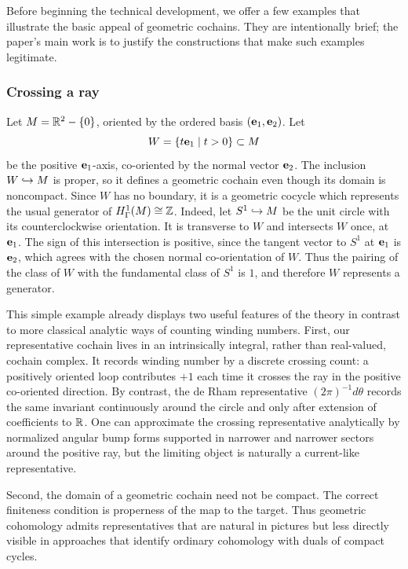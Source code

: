 
Before beginning the technical development, we offer a few examples that illustrate the basic appeal of geometric cochains.
They are intentionally brief; the paper's main work is to justify the constructions that make such examples legitimate.

\subsubsection{Crossing a ray}

Let $M = \mathbb{R}^2 - \{0\}$, oriented by the ordered basis $(\mathbf{e}_1,\mathbf{e}_2)$.
Let
\[
W = \{t\mathbf{e}_1 \mid t > 0\} \subset M
\]
be the positive $\mathbf{e}_1$-axis, co-oriented by the normal vector $\mathbf{e}_2$.
The inclusion $W \hookrightarrow M$ is proper, so it defines a geometric cochain even though its domain is noncompact.
Since $W$ has no boundary, it is a geometric cocycle which represents the usual generator of $H^1_\Gamma(M) \cong \mathbb{Z}$.
Indeed, let $S^1 \hookrightarrow M$ be the unit circle with its counterclockwise orientation.
It is transverse to $W$ and intersects $W$ once, at $\mathbf{e}_1$.
The sign of this intersection is positive, since the tangent vector to $S^1$ at $\mathbf{e}_1$ is $\mathbf{e}_2$, which agrees with the chosen normal co-orientation of $W$.
Thus the pairing of the class of $W$ with the fundamental class of $S^1$ is $1$, and therefore $W$ represents a generator.

This simple example already displays two useful features of the theory in contrast to more classical analytic ways of counting winding numbers.
First, our representative cochain lives in an intrinsically integral, rather than real-valued, cochain complex.
It records winding number by a discrete crossing count: a positively oriented loop contributes $+1$ each time it crosses the ray in the positive co-oriented direction.
By contrast, the de Rham representative $(2\pi)^{-1}d\theta$ records the same invariant continuously around the circle and only after extension of coefficients to $\mathbb{R}$.
One can approximate the crossing representative analytically by normalized angular bump forms supported in narrower and narrower sectors around the positive ray, but the limiting object is naturally a current-like representative.

Second, the domain of a geometric cochain need not be compact.
The correct finiteness condition is properness of the map to the target.
Thus geometric cohomology admits representatives that are natural in pictures but less directly visible in approaches that identify ordinary cohomology with duals of compact cycles.

